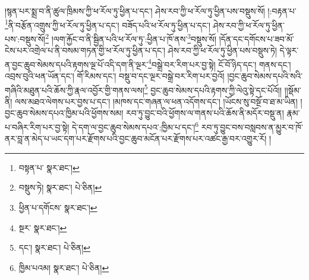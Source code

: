 །སྙན་པར་སྨྲ་བ་ནི་ཚུལ་ཁྲིམས་ཀྱི་ཕ་རོལ་ཏུ་ཕྱིན་པ་དང་། ཤེས་རབ་ཀྱི་ཕ་རོལ་ཏུ་ཕྱིན་པས་བསྡུས་སོ། །:བརྟན་པ་\footnote{བསྟན་པ་  སྣར་ཐང་། }ནི་བརྩོན་འགྲུས་ཀྱི་ཕ་རོལ་ཏུ་ཕྱིན་པ་དང་། བཟོད་པའི་ཕ་རོལ་ཏུ་ཕྱིན་པ་དང་། ཤེས་རབ་ཀྱི་ཕ་རོལ་ཏུ་ཕྱིན་པས་:བསྡུས་སོ།\footnote{བསྡུས་ཏེ།  སྣར་ཐང་།  པེ་ཅིན། } །ལག་རྐྱོང་བ་ནི་སྦྱིན་པའི་ཕ་རོལ་ཏུ་:ཕྱིན་པ་ཁོ་ནས་\footnote{ཕྱིན་པ་དགོངས་  སྣར་ཐང་། }བསྡུས་སོ། །དོན་དང་དགོངས་པ་ཟབ་མོ་ངེས་པར་འགྲེལ་པ་ནི་བསམ་གཏན་གྱི་ཕ་རོལ་ཏུ་ཕྱིན་པ་དང་། ཤེས་རབ་ཀྱི་ཕ་རོལ་ཏུ་ཕྱིན་པས་བསྡུས་ཏེ། དེ་ལྟར་ན་བྱང་ཆུབ་སེམས་དཔའི་རྟགས་ལྔ་པོ་འདི་དག་ནི་ལྔར་\footnote{སྔར་  སྣར་ཐང་། }བསྒྲེ་བར་རིག་པར་བྱ་སྟེ། ངོ་བོ་ཉིད་དང་། གནས་དང་། འབྲས་བུའི་ཕན་ཡོན་དང་། གོ་རིམས་དང་། བསྡུ་བ་དང་ལྔར་བསྒྲེ་བར་རིག་པར་བྱའོ། །བྱང་ཆུབ་སེམས་དཔའི་སའི་གཞིའི་མཐུན་པའི་ཆོས་ཀྱི་རྣལ་འབྱོར་གྱི་གནས་ལས།\footnote{དང་།  སྣར་ཐང་།  པེ་ཅིན། } བྱང་ཆུབ་སེམས་དཔའི་རྟགས་ཀྱི་ལེའུ་སྟེ་དང་པོའོ།། །།སྡོམ་ནི། ལས་མཐའ་ལེགས་པར་བྱས་པ་དང་། །མཁས་དང་གཞན་ལ་ཕན་འདོགས་དང་། །ཡོངས་སུ་བསྔོ་བ་ཐ་མ་ཡིན། །བྱང་ཆུབ་སེམས་དཔའ་ཁྱིམ་པའི་ཕྱོགས་སམ། རབ་ཏུ་བྱུང་བའི་ཕྱོགས་ལ་གནས་པའི་ཆོས་ནི་མདོར་བསྡུ་ན། རྣམ་པ་བཞིར་རིག་པར་བྱ་སྟེ། དེ་དག་ལ་བྱང་ཆུབ་སེམས་དཔའ་:ཁྱིམ་པ་དང་།\footnote{ཁྱིམ་པའམ།  སྣར་ཐང་།  པེ་ཅིན། } རབ་ཏུ་བྱུང་བས་བསླབས་ན་མྱུར་བ་ཁོ་ནར་བླ་ན་མེད་པ་ཡང་དག་པར་རྫོགས་པའི་བྱང་ཆུབ་མངོན་པར་རྫོགས་པར་འཚང་རྒྱ་བར་འགྱུར་རོ། །
